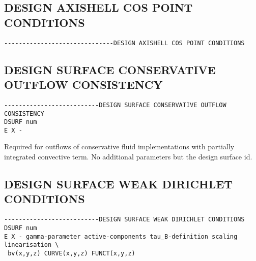 
\subsection{DESIGN AXISHELL COS POINT CONDITIONS}
\begin{verbatim}
------------------------------DESIGN AXISHELL COS POINT CONDITIONS
\end{verbatim}


\subsection{DESIGN SURFACE CONSERVATIVE OUTFLOW CONSISTENCY}

\begin{verbatim}
--------------------------DESIGN SURFACE CONSERVATIVE OUTFLOW CONSISTENCY
DSURF num
E X -
\end{verbatim}

Required for outflows of conservative fluid implementations with
partially integrated convective term.
No additional parameters but the design surface id.

\subsection{DESIGN SURFACE WEAK DIRICHLET CONDITIONS}
\begin{verbatim}
--------------------------DESIGN SURFACE WEAK DIRICHLET CONDITIONS
DSURF num
E X - gamma-parameter active-components tau_B-definition scaling linearisation \
 bv(x,y,z) CURVE(x,y,z) FUNCT(x,y,z)
\end{verbatim}

